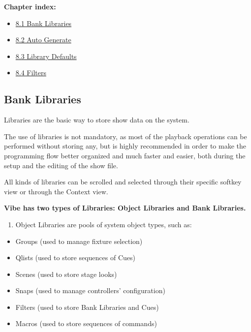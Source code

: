 \documentclass[
]{article}
\providecommand{\tightlist}{%
  \setlength{\itemsep}{0pt}\setlength{\parskip}{0pt}}
\begin{document}
\textbf{Chapter index:}

\begin{itemize}
\tightlist
\item
  \protect\hyperlink{Bank-Libraries-8.1}{8.1 Bank Libraries}
\item
  \protect\hyperlink{Auto-Generate-8.2}{8.2 Auto Generate}
\item
  \protect\hyperlink{Library-Defaults-8.3}{8.3 Library Defaults}
\item
  \protect\hyperlink{Filters-8.4}{8.4 Filters}
\end{itemize}

\hypertarget{Bank-Libraries-8.1}{%
\subsection{Bank Libraries}\label{Bank-Libraries-8.1}}

Libraries are the basic way to store show data on the system.

The use of libraries is not mandatory, as most of the playback operations can be performed without storing any, but is highly recommended in order to make the programming flow better organized and much faster and easier, both during the setup and the editing of the show file.

All kinds of libraries can be scrolled and selected through their specific softkey view or through the Context view.

\textbf{Vibe has two types of Libraries: Object Libraries and Bank Libraries.}

\begin{enumerate}
\def\labelenumi{\arabic{enumi}.}
\tightlist
\item
  Object Libraries are pools of system object types, such as:
\end{enumerate}

\begin{itemize}
\item
  Groups (used to manage fixture selection)
\item
  Qlists (used to store sequences of Cues)
\item
  Scenes (used to store stage looks)
\item
  Snaps (used to manage controllers' configuration)
\item
  Filters (used to store Bank Libraries and Cues)
\item
  Macros (used to store sequences of commands)
\end{itemize}
\end{document}
